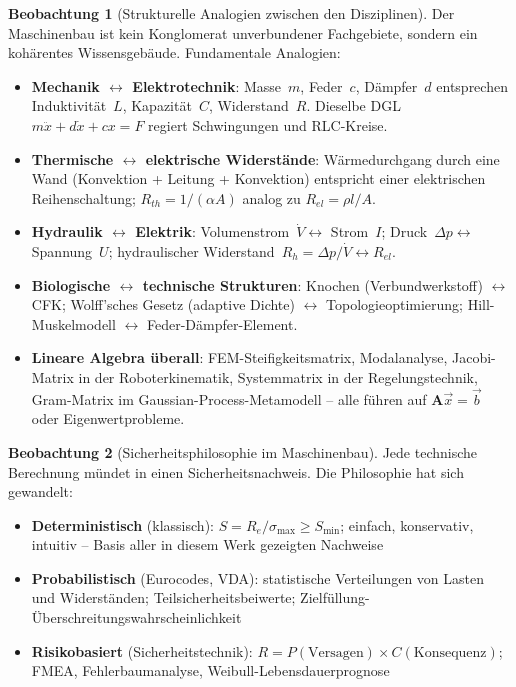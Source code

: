 ﻿\documentclass[a4paper,12pt]{report}
\theoremstyle{definition}
\newtheorem{beobachtung}{Beobachtung}
\begin{document}
\begin{beobachtung}[Strukturelle Analogien zwischen den Disziplinen]
Der Maschinenbau ist kein Konglomerat unverbundener Fachgebiete,
sondern ein kohärentes Wissensgebäude. Fundamentale Analogien:
\begin{itemize}
    \item[-] \textbf{Mechanik $\leftrightarrow$ Elektrotechnik}: Masse~$m$,
          Feder~$c$, Dämpfer~$d$ entsprechen Induktivität~$L$, Kapazität~$C$,
          Widerstand~$R$. Dieselbe DGL $m\ddot{x}+d\dot{x}+cx = F$
          regiert Schwingungen und RLC-Kreise.
    \item[-] \textbf{Thermische $\leftrightarrow$ elektrische Widerstände}:
          Wärmedurchgang durch eine Wand (Konvektion + Leitung + Konvektion)
          entspricht einer elektrischen Reihenschaltung; $R_{th} = 1/(\alpha A)$
          analog zu $R_{el} = \rho l/A$.
    \item[-] \textbf{Hydraulik $\leftrightarrow$ Elektrik}: Volumenstrom~$\dot{V}
          \leftrightarrow$ Strom~$I$; Druck~$\Delta p \leftrightarrow$ Spannung~$U$;
          hydraulischer Widerstand~$R_h = \Delta p/\dot{V} \leftrightarrow R_{el}$.
    \item[-] \textbf{Biologische $\leftrightarrow$ technische Strukturen}:
          Knochen (Verbundwerkstoff) $\leftrightarrow$ CFK;
          Wolff'sches Gesetz (adaptive Dichte) $\leftrightarrow$ Topologieoptimierung;
          Hill-Muskelmodell $\leftrightarrow$ Feder-Dämpfer-Element.
    \item[-] \textbf{Lineare Algebra überall}: FEM-Steifigkeitsmatrix, Modalanalyse,
          Jacobi-Matrix in der Roboterkinematik, Systemmatrix in der Regelungstechnik,
          Gram-Matrix im Gaussian-Process-Metamodell -- alle führen auf
          $\mathbf{A}\vec{x} = \vec{b}$ oder Eigenwertprobleme.
\end{itemize}
\end{beobachtung}

\begin{beobachtung}[Sicherheitsphilosophie im Maschinenbau]
Jede technische Berechnung mündet in einen Sicherheitsnachweis.
Die Philosophie hat sich gewandelt:
\begin{itemize}
    \item[-] \textbf{Deterministisch} (klassisch): $S = R_e/\sigma_{\max} \ge S_{\min}$;
          einfach, konservativ, intuitiv -- Basis aller in diesem Werk gezeigten Nachweise
    \item[-] \textbf{Probabilistisch} (Eurocodes, VDA): statistische Verteilungen von
          Lasten und Widerständen; Teilsicherheitsbeiwerte; Zielfüllung-Überschreitungswahrscheinlichkeit
    \item[-] \textbf{Risikobasiert} (Sicherheitstechnik): $R = P(\text{Versagen}) \times C(\text{Konsequenz})$;
          FMEA, Fehlerbaumanalyse, Weibull-Lebensdauerprognose
\end{itemize}
\end{beobachtung}
\end{document}
